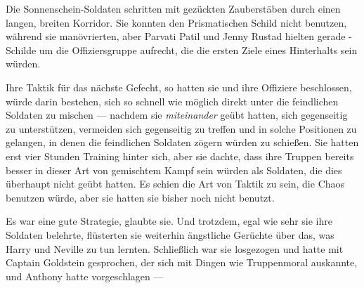 \later

Die Sonnenschein-Soldaten schritten mit gezückten Zauberstäben durch einen langen, breiten Korridor. Sie konnten den Prismatischen Schild nicht benutzen, während sie manövrierten, aber Parvati Patil und Jenny Rustad hielten gerade -Schilde um die Offiziersgruppe aufrecht, die die ersten Ziele eines Hinterhalts sein würden.

Ihre Taktik für das nächste Gefecht, so hatten sie und ihre Offiziere beschlossen, würde darin bestehen, sich so schnell wie möglich direkt unter die feindlichen Soldaten zu mischen — nachdem sie \emph{miteinander} geübt hatten, sich gegenseitig zu unterstützen, vermeiden sich gegenseitig zu treffen und in solche Positionen zu gelangen, in denen die feindlichen Soldaten zögern würden zu schießen. Sie hatten erst vier Stunden Training hinter sich, aber sie dachte, dass ihre Truppen bereits besser in dieser Art von gemischtem Kampf sein würden als Soldaten, die dies überhaupt nicht geübt hatten. Es schien die Art von Taktik zu sein, die Chaos benutzen würde, aber sie hatten sie bisher noch nicht benutzt.

Es war eine gute Strategie, glaubte sie. Und trotzdem, egal wie sehr sie ihre Soldaten belehrte, flüsterten sie weiterhin ängstliche Gerüchte über das, was Harry und Neville zu tun lernten. Schließlich war sie losgezogen und hatte mit Captain Goldstein gesprochen, der sich mit Dingen wie Truppenmoral auskannte, und Anthony hatte vorgeschlagen —

